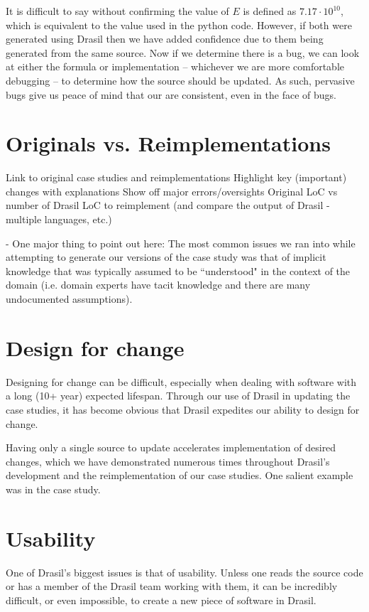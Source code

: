 It is difficult to say without confirming the value of $E$ is defined as 
$7.17\cdot{}10^{10}$, which is equivalent to the value used in the python code. 
However, if both \sfs{} were generated using Drasil then we have added 
confidence due to them being generated from the same source. Now if we 
determine there is a bug, we can look at either the formula or implementation 
-- whichever we are more comfortable debugging -- to determine how the source 
should be updated. As such, pervasive bugs give us peace of mind that our 
\sfs{} are consistent, even in the face of bugs.

\section{Originals vs. Reimplementations}
	Link to original case studies and reimplementations
	Highlight key (important) changes with explanations
	Show off major errors/oversights
	Original \sfs{} LoC vs number of Drasil LoC to reimplement (and compare the 
	output of Drasil - multiple languages, etc.)

- One major thing to point out here: The most common issues we ran into while 
attempting to generate our versions of the case study \sfs{} was that of 
implicit knowledge that was typically assumed to be ``understood" in the 
context of the domain (i.e. domain experts have tacit knowledge and there are 
many undocumented assumptions).

\section{Design for change}

Designing for change can be difficult, especially when dealing with software 
with a long (10+ year) expected lifespan. Through our use of Drasil in updating 
the case studies, it has become obvious that Drasil expedites our ability to 
design for change.

Having only a single source to update accelerates implementation of desired 
changes, which we have demonstrated numerous times throughout Drasil's 
development and the reimplementation of our case studies. One salient example 
was in the \gb{} case study.

	
\section{Usability}
One of Drasil's biggest issues is that of usability. Unless one reads the source
code or has a member of the Drasil team working with them, it can be incredibly
difficult, or even impossible, to create a new piece of software in Drasil.

